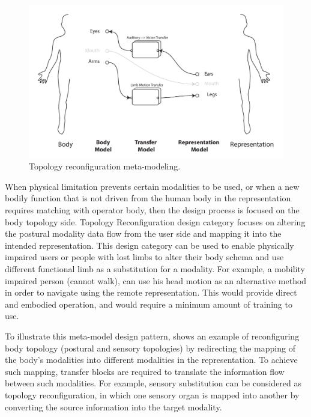 \begin{figure}[b!]
  \centering
  \captionsetup{justification=centering}
\includegraphics[width=1\textwidth]{figures/concept/EDD-Top.pdf}
\caption{Topology reconfiguration meta-modeling.}
  \label{fig:concept-EDD-TopRec}
\end{figure}

When physical limitation prevents certain modalities to be used, or when a new bodily function that is not driven from the human body in the representation requires matching with operator body, then the design process is focused on the body topology side. Topology Reconfiguration design category focuses on altering the postural modality data flow from the user side and mapping it into the intended representation. This design category can be used to enable physically impaired users or people with lost limbs to alter their body schema and use different functional limb as a substitution for a modality. For example, a mobility impaired person (cannot walk), can use his head motion as an alternative method in order to navigate using the remote representation. This would provide direct and embodied operation, and would require a minimum amount of training to use.

To illustrate this meta-model design pattern,  shows an example of reconfiguring body topology (postural and sensory topologies) by redirecting the mapping of the body's modalities into different modalities in the representation. To achieve such mapping, transfer blocks are required to translate the information flow between such modalities. For example, sensory substitution can be considered as topology reconfiguration, in which one sensory organ is mapped into another by converting the source information into the target modality. 

